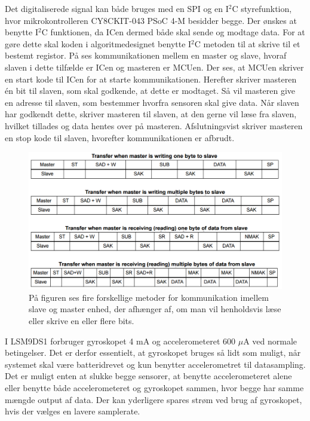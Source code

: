 Det digitaliserede signal kan både bruges med en SPI og en I$^{2}$C styrefunktion, hvor mikrokontrolleren CY8CKIT-043 PSoC 4-M besidder begge. Der ønskes at benytte I$^{2}$C funktionen, da ICen dermed både skal sende og modtage data. For at gøre dette skal koden i algoritmedesignet benytte I$^2$C metoden til at skrive til et bestemt registor. På  ses kommunikationen mellem en master og slave, hvoraf slaven i dette tilfælde er ICen og masteren er MCUen. Der ses, at MCUen skriver en start kode til ICen for at starte kommunikationen. Herefter skriver masteren én bit til slaven, som skal godkende, at dette er modtaget. Så vil masteren give en adresse til slaven, som bestemmer hvorfra sensoren skal give data. Når slaven har godkendt dette, skriver masteren til slaven, at den gerne vil læse fra slaven, hvilket tillades og data hentes over på masteren. Afslutningsvist skriver masteren en stop kode til slaven, hvorefter kommunikationen er afbrudt. %
\begin{figure}[H]
	\centering
	\includegraphics[scale=0.6]{figures/cDesign/Sensor_write_read.png}
	\caption{På figuren ses fire forskellige metoder for kommunikation imellem slave og master enhed, der afhænger af, om man vil henholdsvis læse eller skrive en eller flere bits.\citep{STMicroelectronics2016}}
	\label{Fig:master_slave}
\end{figure}
I LSM9DS1 forbruger gyroskopet 4 mA og accelerometeret 600 $\mu$A ved normale betingelser. Det er derfor essentielt, at gyroskopet bruges så lidt som muligt, når systemet skal være batteridrevet og kun benytter accelerometret til datasampling. Det er muligt enten at slukke begge sensorer, at benytte accelerometeret alene eller benytte både accelerometeret og gyroskopet sammen, hvor begge har samme mængde output af data. Der kan yderligere spares strøm ved brug af gyroskopet, hvis der vælges en lavere samplerate.\\ %

